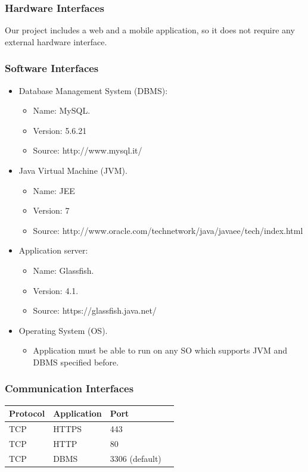 \subsubsection{Hardware Interfaces}
Our project includes a web and a mobile application, so it does not require
any external hardware interface.
\subsubsection{Software Interfaces}
\begin{itemize}
	\item Database Management System (DBMS):
	\begin{itemize}
		\item Name: MySQL.
		\item Version: 5.6.21
		\item Source: http://www.mysql.it/
	\end{itemize}
	\item Java Virtual Machine (JVM).
	\begin{itemize}
		\item Name: JEE
		\item Version: 7
		\item Source: http://www.oracle.com/technetwork/java/javaee/tech/index.html
	\end{itemize}
	\item Application server:
	\begin{itemize}
		\item Name: Glassfish.
		\item Version: 4.1.
		\item Source: https://glassfish.java.net/
	\end{itemize}
	\item Operating System (OS).
	\begin{itemize}
		\item Application must be able to run on any SO which supports JVM and DBMS specified before.
	\end{itemize}
\end{itemize}
\subsubsection{Communication Interfaces}
\begin{center}
	\begin{tabular}{ | l | l | l | p{5cm} |}
		\hline
		Protocol & Application & Port 	\\ \hline
		TCP & HTTPS & 443				\\ \hline
		TCP & HTTP  & 80				\\ \hline
		TCP & DBMS  & 3306 (default)	\\ \hline
	\end{tabular}
\end{center}
